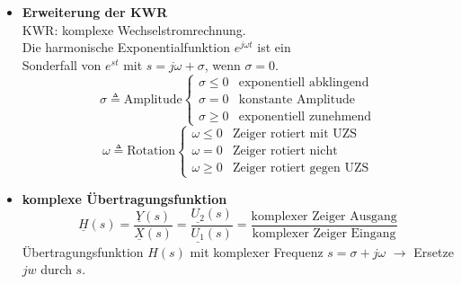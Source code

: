   \begin{itemize}\small
      \item{\textbf{Erweiterung der KWR}}\\
      KWR: komplexe Wechselstromrechnung. \\
          Die harmonische Exponentialfunktion $e^{j\omega t}$ ist ein
          \\Sonderfall von $e^{st}$ mit $s=j\omega+\sigma$, wenn $\sigma=0$.
          \[
              \sigma \triangleq \text{Amplitude}
              \begin{cases}
                  \sigma \leq 0 & \text{exponentiell abklingend}\\
                  \sigma = 0 & \text{konstante Amplitude}\\
                  \sigma \geq 0 & \text{exponentiell zunehmend}
              \end{cases}
          \]
          \[
              \omega \triangleq \text{Rotation}
              \begin{cases}
                  \omega \leq 0 & \text{Zeiger rotiert mit UZS}\\
                  \omega = 0 & \text{Zeiger rotiert nicht}\\
                  \omega \geq 0 & \text{Zeiger rotiert gegen UZS}
              \end{cases}
          \]
          \normalsize
  

\item \textbf{komplexe \"Ubertragungsfunktion}
  \footnotesize
  \[
      \underline{H}(s)=\frac{\underline{Y}(s)}{\underline{X}(s)}=\frac{\underline{U_2}(s)}{\underline{U_1}(s)}=\frac{\text{komplexer
      Zeiger Ausgang}}{\text{komplexer Zeiger
      Eingang}}
  \]
  \normalsize
  Übertragungsfunktion $H(s)$ mit komplexer Frequenz
  $s=\sigma+j\omega$ $\rightarrow$ Ersetze $jw$ durch $s$.
\end{itemize}
  
